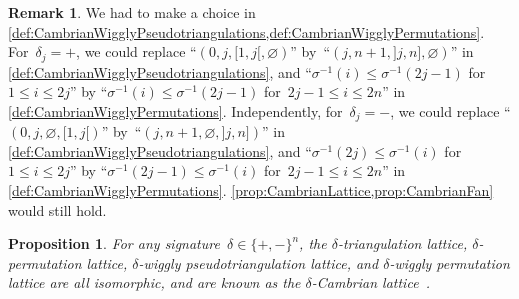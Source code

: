 \documentclass{amsart}
\newtheorem{proposition}[theorem]{Proposition}
\theoremstyle{definition}
\newtheorem{remark}[theorem]{Remark}
\newcommand{\darkblue}{\color{darkblue}} %
\newcommand{\defn}[1]{\textsl{\darkblue #1}} %
\begin{document}
\begin{remark}
We had to make a choice in \cref{def:CambrianWigglyPseudotriangulations,def:CambrianWigglyPermutations}.
For~$\delta_j = {+}$, we could replace ``$(0, j, {[1,j[}, \varnothing)$'' by~``$(j, n+1, {]j,n]}, \varnothing)$'' in \cref{def:CambrianWigglyPseudotriangulations}, and ``$\sigma^{-1}(i) \le \sigma^{-1}(2j-1)$ for~$1 \le i \le 2j$'' by ``$\sigma^{-1}(i) \le \sigma^{-1}(2j-1)$ for~$2j-1 \le i \le 2n$'' in \cref{def:CambrianWigglyPermutations}.
Independently, for~$\delta_j = {-}$, we could replace ``$(0, j, \varnothing, {[1,j[})$'' by~``$(j, n+1, \varnothing, {]j,n]})$'' in \cref{def:CambrianWigglyPseudotriangulations}, and ``$\sigma^{-1}(2j) \le \sigma^{-1}(i)$ for~$1 \le i \le 2j$'' by ``$\sigma^{-1}(2j-1) \le \sigma^{-1}(i)$ for~$2j-1 \le i \le 2n$'' in \cref{def:CambrianWigglyPermutations}.
\cref{prop:CambrianLattice,prop:CambrianFan} would still hold.
\end{remark}

\begin{proposition}
\label{prop:CambrianLattice}
For any signature~$\delta \in \{+,-\}^n$, the $\delta$-triangulation lattice, $\delta$-permutation lattice, \mbox{$\delta$-wiggly} pseudotriangulation lattice, and $\delta$-wiggly permutation lattice are all isomorphic, and are known as the \defn{$\delta$-Cambrian lattice}~\cite{Reading-CambrianLattices}.
\end{proposition}
\end{document}
